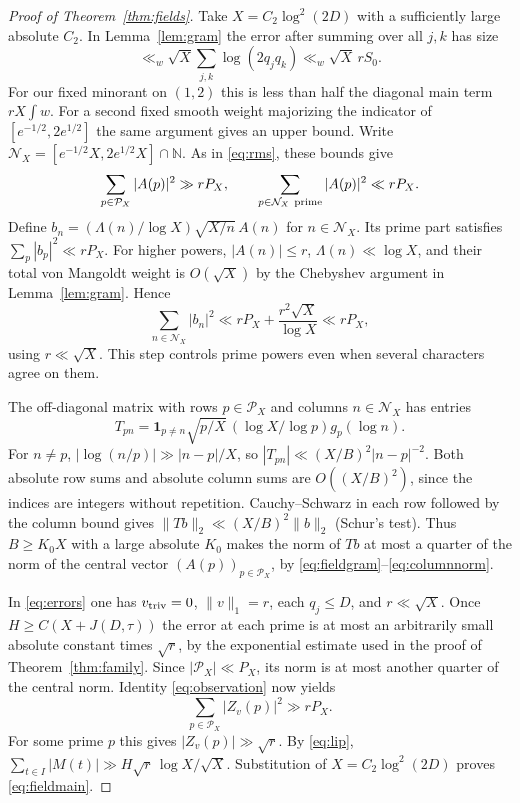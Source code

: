 \documentclass[11pt]{article}
\newcommand{\calP}{\mathcal P}\newcommand{\wh}{\widehat}
\begin{document}
\begin{proof}[Proof of Theorem~\ref{thm:fields}]
Take $X=C_2\log^2(2D)$ with a sufficiently large absolute $C_2$. In
Lemma~\ref{lem:gram} the error after summing over all $j,k$ has size
\[
 \ll_w \sqrt X\sum_{j,k}\log(2q_jq_k)\ll_w \sqrt X\,rS_0 .
\]
For our fixed minorant on $(1,2)$ this is less than half the diagonal
main term $rX\int w$. For a second fixed smooth weight majorizing the
indicator of $[e^{-1/2},2e^{1/2}]$ the same argument gives an upper
bound. Write $\mathcal N_X=[e^{-1/2}X,2e^{1/2}X]\cap\mathbb N$.
As in \eqref{eq:rms}, these bounds give
\begin{equation}\label{eq:fieldgram}
 \sum_{p\in\calP_X}|A(p)|^2\gg rP_X,\qquad
 \sum_{p\in\mathcal N_X\ {\rm prime}} |A(p)|^2\ll rP_X .
\end{equation}
Define $b_n=(\Lambda(n)/\log X)\sqrt{X/n}\,A(n)$ for $n\in\mathcal N_X$.
Its prime part satisfies $\sum_{p}|b_p|^2\ll rP_X$. For higher powers,
$|A(n)|\le r$, $\Lambda(n)\ll\log X$, and their total von Mangoldt
weight is $O(\sqrt X)$ by the Chebyshev argument in Lemma~\ref{lem:gram}.
Hence
\begin{equation}\label{eq:columnnorm}
 \sum_{n\in\mathcal N_X}|b_n|^2
 \ll rP_X+\frac{r^2\sqrt X}{\log X}\ll rP_X ,
\end{equation}
using $r\ll\sqrt X$. This step controls prime powers even when several
characters agree on them.

The off-diagonal matrix with rows $p\in\calP_X$ and columns
$n\in\mathcal N_X$ has entries
\[
 T_{pn}=\mathbf1_{p\ne n}\sqrt{p/X}\,(\log X/\log p)g_p(\log n).
\]
For $n\ne p$, $|\log(n/p)|\gg |n-p|/X$, so
$|T_{pn}|\ll(X/B)^2|n-p|^{-2}$. Both absolute row sums and absolute
column sums are $O((X/B)^2)$, since the indices are integers without
repetition. Cauchy--Schwarz in each row followed by the column bound gives
$\|Tb\|_2\ll(X/B)^2\|b\|_2$ (Schur's test). Thus $B\ge K_0 X$ with
a large absolute $K_0$ makes the norm of $Tb$ at most a quarter of the
norm of the central vector $(A(p))_{p\in\calP_X}$, by
\eqref{eq:fieldgram}--\eqref{eq:columnnorm}.

In \eqref{eq:errors} one has $v_{\rm triv}=0$, $\|v\|_1=r$, each $q_j\le D$, and $r\ll\sqrt X$.
Once $H\ge C(X+J(D,\tau))$ the error at each prime is at most an
arbitrarily small absolute constant times $\sqrt r$, by the exponential
estimate used in the proof of Theorem~\ref{thm:family}. Since
$|\calP_X|\ll P_X$, its norm is at most another quarter of the central
norm. Identity \eqref{eq:observation} now yields
\[
 \sum_{p\in\calP_X}|Z_v(p)|^2\gg rP_X .
\]
For some prime $p$ this gives $|Z_v(p)|\gg\sqrt r$. By \eqref{eq:lip},
$\sum_{t\in I}|M(t)|\gg H\sqrt r\,\log X/\sqrt X$.
Substitution of $X=C_2\log^2(2D)$ proves \eqref{eq:fieldmain}.
\end{proof}
\end{document}
